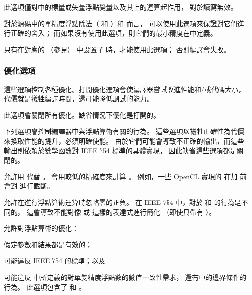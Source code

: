 此選項僅對中的標量或矢量浮點變量以及其上的運算起作用，
對於讀寫無效。
\stopclOption

對於源碼中的單精度浮點除法（  和  ）和  而言，
可以使用此選項來保證對它們進行正確的舍入；
而如果沒有使用此選項，則它們的最小精度在中定義。

只有在對應的  （參見）
中設置了  時，才能使用此選項；
否則編譯會失敗。
\stopclOption

\subsubsection[sec:OptimizationOption]{優化選項}

這些選項控制各種優化。打開優化選項會使編譯器嘗試改進性能和/或代碼大小，
代價就是犧牲編譯時間，還可能降低調試的能力。

此選項會關閉所有優化。缺省情況下優化是打開的。
\stopclOption

下列選項會控制編譯器中與浮點算術有關的行為。
這些選項以犧牲正確性為代價來換取性能的提升，必須明確使能。
由於它們可能會導致不正確的輸出，而這些輸出則依賴於數學函數對 IEEE 754 標準的具體實現，
因此缺省這些選項都是關閉的。

允許用  代替 。
  會用較低的精確度來計算 。
例如，一些 OpenCL 實現的  在加  前會對  進行截斷。
\stopclOption

允許在進行浮點算術運算時忽略零的正負。
在 IEEE 754 中，對於  和  的行為是不同的，
這會導致不能對像  或  這樣的表達式進行簡化
（即使只帶有  ）。
\stopclOption

允許對浮點算術的優化：
\startigBase
\item 假定參數和結果都是有效的；
\item 可能違反 IEEE 754 的標準；以及
\item 可能違反 中所定義的對單雙精度浮點數的數值一致性需求，
還有中的邊界條件的行為。
\stopigBase
此選項包含了  和 。
\stopclOption

